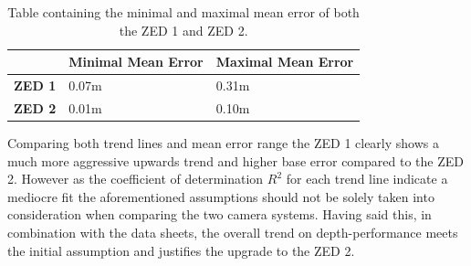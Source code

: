 \begin{table}[h]
	\centering
	\begin{tabular}{|l|l|l|}
		\hline
		& \textbf{Minimal Mean Error} & \textbf{Maximal Mean Error} \\ \hline
		\textbf{ZED 1}  & 0.07m 					  & 0.31m                      \\ \hline
		\textbf{ZED 2} & 0.01m                      & 0.10m                      \\ \hline
	\end{tabular}
	\caption{Table containing the minimal and maximal mean error of both the ZED 1 and ZED 2.}
	\label{tab:errorMinimaMaxima}
\end{table}



Comparing both trend lines and mean error range the ZED 1 clearly shows a much more aggressive upwards trend and higher base error compared to the ZED 2. However as the coefficient of determination $R^{2}$ for each trend line indicate a mediocre fit the aforementioned assumptions should not be solely taken into consideration when comparing the two camera systems. 
Having said this, in combination with the data sheets, the overall trend on depth-performance meets the initial assumption and justifies the upgrade to the ZED 2.


\filbreak